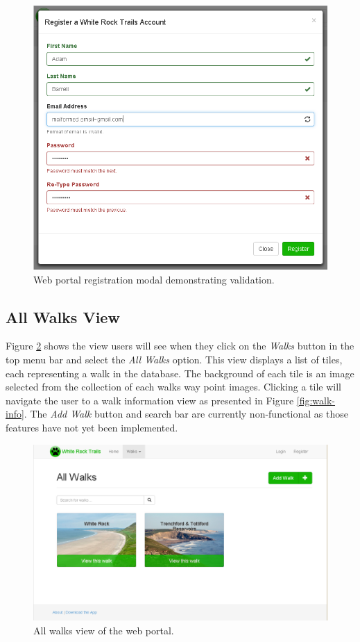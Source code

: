 \documentclass[11pt,a4paper]{article}
\begin{document}
\begin{figure}[H]
\centering
\includegraphics[width=0.8\linewidth]{./img/webportal/registration}
\caption{Web portal registration modal demonstrating validation.}
\label{fig:registration}
\end{figure}

\subsection{All Walks View}

Figure \ref{fig:all-walks} shows the view users will see when they click on the \emph{Walks} button in the top menu bar and select the \emph{All Walks} option. This view displays a list of tiles, each representing a walk in the database. The background of each tile is an image selected from the collection of each walks way point images. Clicking a tile will navigate the user to a walk information view as presented in Figure \ref{fig:walk-info}. The \emph{Add Walk} button and search bar are currently non-functional as those features have not yet been implemented.

\begin{figure}[H]
\centering
\includegraphics[width=0.8\linewidth]{./img/webportal/all-walks}
\caption{All walks view of the web portal.}
\label{fig:all-walks}
\end{figure}
\end{document}
